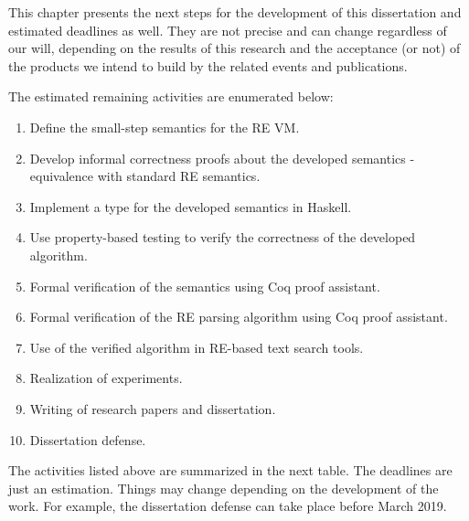 \documentclass[oneside,12pt]{scrbook}
\theoremstyle{definition}
\theoremstyle{plain}
\theoremstyle{definition}
\begin{document}
This chapter presents the next steps for the development of this dissertation and estimated deadlines as well. They are not precise and can change regardless of our will, depending on the results of this research and the acceptance (or not) of the products we intend to build by the related events and publications.

The estimated remaining activities are enumerated below:

\begin{enumerate}
	\item Define the small-step semantics for the RE VM.
	\item Develop informal correctness proofs about the developed semantics - equivalence with standard RE semantics.
	\item Implement a type for the developed semantics in Haskell. 
	\item Use property-based testing to verify the correctness of the developed algorithm.
	\item Formal verification of the semantics using Coq proof assistant.
	\item Formal verification of the RE parsing algorithm using Coq proof assistant.
	\item Use of the verified algorithm in RE-based text search tools.
	\item Realization of experiments.
	\item Writing of research papers and dissertation.
	\item Dissertation defense.
\end{enumerate}

The activities listed above are summarized in the next table. The deadlines are just an estimation. Things may change depending on the development of the work. For example, the dissertation defense can take place before March 2019.
\end{document}
